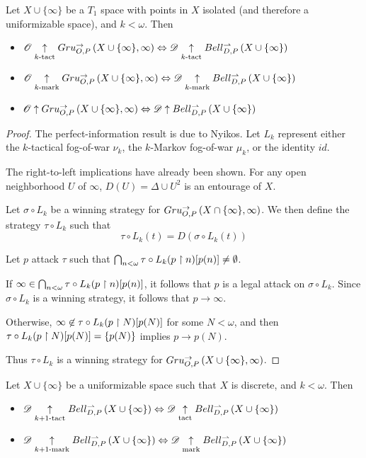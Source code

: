 \begin{thm}
  Let $X\cup\{\infty\}$ be a $T_1$ space with points in $X$ isolated
  (and therefore a uniformizable space),
  and $k<\omega$. Then
  \begin{itemize}
    \item
      $
        \mathscr{O}\underset{k\text{-tact}}{\uparrow} Gru_{O,P}^{\to}\left({X\cup\{\infty\}},{\infty}\right)
          \Leftrightarrow
        \mathscr{D} \underset{k\text{-tact}}{\uparrow} Bell_{D,P}^{\rightharpoonup}\left({X\cup\{\infty\}}\right)
      $
    \item
      $
        \mathscr{O}\underset{k\text{-mark}}{\uparrow} Gru_{O,P}^{\to}\left({X\cup\{\infty\}},{\infty}\right)
          \Leftrightarrow
        \mathscr{D} \underset{k\text{-mark}}{\uparrow} Bell_{D,P}^{\rightharpoonup}\left({X\cup\{\infty\}}\right)
      $
    \item
      $
        \mathscr{O}\uparrow Gru_{O,P}^{\to}\left({X\cup\{\infty\}},{\infty}\right)
          \Leftrightarrow
        \mathscr{D} \uparrow Bell_{D,P}^{\rightharpoonup}\left({X\cup\{\infty\}}\right)
      $
  \end{itemize}
\end{thm}

\begin{proof}
  The perfect-information result is due to Nyikos.
  Let $L_k$ represent either the $k$-tactical fog-of-war $\nu_k$,
  the $k$-Markov fog-of-war $\mu_k$, or the identity $id$.

  The right-to-left implications have already been shown.
  For any open neighborhood $U$ of $\infty$,
  $D(U)=\Delta\cup U^2$ is an entourage of $X$.

  Let $\sigma\circ{L}_k$ be a winning strategy for
  $Gru_{O,P}^{\to}\left({X\cap\{\infty\}},{\infty}\right)$.
  We then define the strategy $\tau\circ L_k$ such that
    \[
      \tau\circ{L}_k(t) = D(\sigma\circ{L}_k(t))
    \]

  Let $p$ attack $\tau$ such that
  $\bigcap_{n<\omega}\tau\circ{L}_k(p\restriction n)[p(n)]\not=\emptyset$.

  If $\infty\in\bigcap_{n<\omega}\tau\circ{L}_k(p\restriction n)[p(n)]$, it follows
  that $p$ is a legal attack on $\sigma\circ{L}_k$. Since $\sigma\circ{L}_k$
  is a winning strategy, it follows that $p\to\infty$.

  Otherwise, $\infty\not\in\tau\circ{L}_k(p\restriction N)[p(N)]$ for some $N<\omega$,
  and then
  $\tau\circ{L}_k(p\restriction N)[p(N)]=\{p(N)\}$ implies $p\to p(N)$.

  Thus $\tau\circ L_k$ is a winning strategy for
  $Gru_{O,P}^{\to}\left({X\cup\{\infty\}},{\infty}\right)$.
\end{proof}

\begin{cor}
  Let $X\cup\{\infty\}$ be a uniformizable space such that $X$ is discrete,
  and $k<\omega$. Then
  \begin{itemize}
    \item
      $
        \mathscr{D}\underset{k+1\text{-tact}}{\uparrow}Bell_{D,P}^{\rightharpoonup}\left({X\cup\{\infty\}}\right)
          \Leftrightarrow
        \mathscr{D}\underset{\text{tact}}{\uparrow}Bell_{D,P}^{\rightharpoonup}\left({X\cup\{\infty\}}\right)
      $
    \item
      $
        \mathscr{D}\underset{k+1\text{-mark}}{\uparrow}Bell_{D,P}^{\rightharpoonup}\left({X\cup\{\infty\}}\right)
          \Leftrightarrow
        \mathscr{D}\underset{\text{mark}}{\uparrow}Bell_{D,P}^{\rightharpoonup}\left({X\cup\{\infty\}}\right)
      $
  \end{itemize}
\end{cor}

